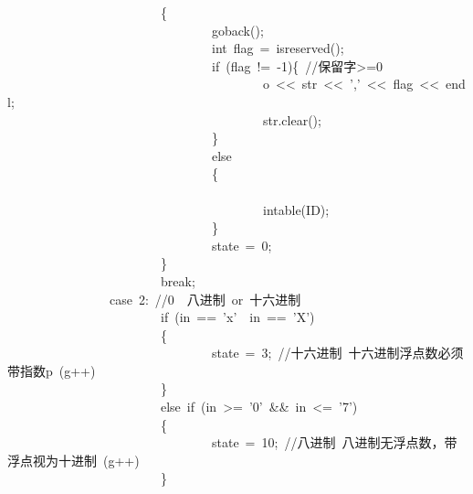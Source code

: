 \documentclass{article}
\begin{document}
\begin{mdpre}
~~~~~~~~~~~~~~~~~~~~~~~~\{\\
~~~~~~~~~~~~~~~~~~~~~~~~~~~~~~~~goback();\\
~~~~~~~~~~~~~~~~~~~~~~~~~~~~~~~~{int}~flag~=~isreserved();\\
~~~~~~~~~~~~~~~~~~~~~~~~~~~~~~~~{if}~(flag~!=~-{1})\{~{//保留字\textgreater{}=0}\\
~~~~~~~~~~~~~~~~~~~~~~~~~~~~~~~~~~~~~~~~o~\textless{}\textless{}~str~\textless{}\textless{}~{','}~\textless{}\textless{}~flag~\textless{}\textless{}~endl;\\
~~~~~~~~~~~~~~~~~~~~~~~~~~~~~~~~~~~~~~~~str.clear();\\
~~~~~~~~~~~~~~~~~~~~~~~~~~~~~~~~\}\\
~~~~~~~~~~~~~~~~~~~~~~~~~~~~~~~~{else}\\
~~~~~~~~~~~~~~~~~~~~~~~~~~~~~~~~\{\\
~~~~~~~~~~~~~~~~~~~~~~~~~~~~~~~~~~~~~~~~\\
~~~~~~~~~~~~~~~~~~~~~~~~~~~~~~~~~~~~~~~~intable({ID});\\
~~~~~~~~~~~~~~~~~~~~~~~~~~~~~~~~\}\\
~~~~~~~~~~~~~~~~~~~~~~~~~~~~~~~~state~=~{0};\\
~~~~~~~~~~~~~~~~~~~~~~~~\}\\
~~~~~~~~~~~~~~~~~~~~~~~~{break};\\
~~~~~~~~~~~~~~~~{case}~{2}:~{//0~~八进制~or~十六进制}\\
~~~~~~~~~~~~~~~~~~~~~~~~{if}~(in~==~{'x'}~\textbar{}\textbar{}~in~==~{'X'})\\
~~~~~~~~~~~~~~~~~~~~~~~~\{\\
~~~~~~~~~~~~~~~~~~~~~~~~~~~~~~~~state~=~{3};~{//十六进制~十六进制浮点数必须带指数p~(g++)}\\
~~~~~~~~~~~~~~~~~~~~~~~~\}\\
~~~~~~~~~~~~~~~~~~~~~~~~{else}~{if}~(in~\textgreater{}=~{'0'}~\&\&~in~\textless{}=~{'7'})\\
~~~~~~~~~~~~~~~~~~~~~~~~\{\\
~~~~~~~~~~~~~~~~~~~~~~~~~~~~~~~~state~=~{10};~{//八进制~八进制无浮点数，带浮点视为十进制~(g++)}\\
~~~~~~~~~~~~~~~~~~~~~~~~\}\\

\end{mdpre}
\end{document}
